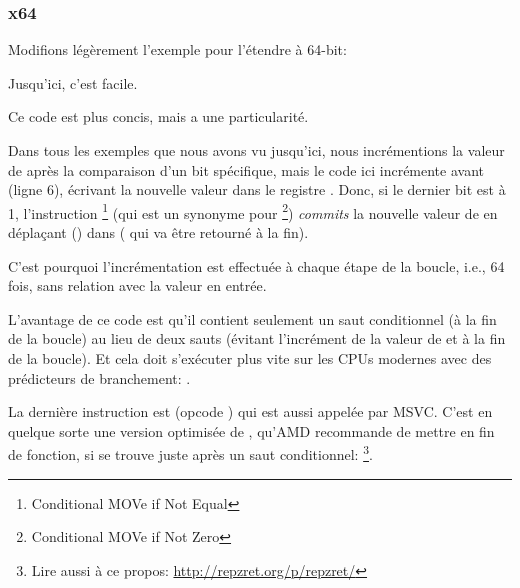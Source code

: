 \subsubsection{x64}
\label{subsec:popcnt}

Modifions légèrement l'exemple pour l'étendre à 64-bit:




Jusqu'ici, c'est facile.






Ce code est plus concis, mais a une particularité.

Dans tous les exemples que nous avons vu jusqu'ici, nous incrémentions la valeur
de  après la comparaison d'un bit spécifique, mais le code ici incrémente 
avant (ligne 6), écrivant la nouvelle valeur dans le registre \EDX.
Donc, si le dernier bit est à 1, l'instruction \CMOVNE\footnote{Conditional MOVe if Not Equal}
(qui est un synonyme pour \CMOVNZ\footnote{Conditional MOVe if Not Zero}) \emph{commits}
la nouvelle valeur de  en déplaçant  \EDX () dans
\EAX ( qui va être retourné à la fin).

C'est pourquoi l'incrémentation est effectuée à chaque étape de la boucle, i.e.,
64 fois, sans relation avec la valeur en entrée.

L'avantage de ce code est qu'il contient seulement un saut conditionnel (à la fin
de la boucle) au lieu de deux sauts (évitant l'incrément de la valeur de  et
à la fin de la boucle).
Et cela doit s'exécuter plus vite sur les CPUs modernes avec des prédicteurs de branchement:
.

\label{FATRET}
La dernière instruction est  (opcode ) qui est aussi appelée
 par MSVC.
C'est en quelque sorte une version optimisée de \RET, qu'AMD recommande de mettre
en fin de fonction, si \RET se trouve juste après un saut conditionnel:
\footnote{Lire aussi à ce propos: \url{http://repzret.org/p/repzret/}}.

